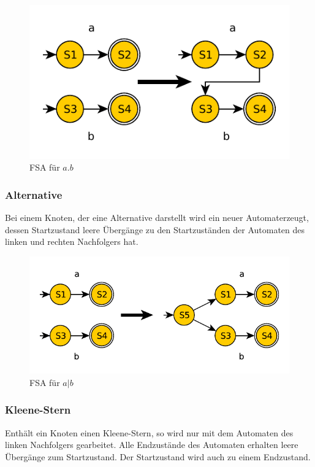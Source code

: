 \begin{figure}[H]
  \begin{center}
  \includegraphics{objectsToInclude/re_fsa_aANDb.pdf}
  \caption{FSA für $a.b$}
  \label{fig:Konkatenation}
  \end{center}
\end{figure}

\subsubsection{Alternative}
Bei einem Knoten, der eine
Alternative darstellt wird ein neuer
Automaterzeugt, dessen
Startzustand leere Übergänge zu den
Startzuständen der Automaten des
linken und rechten Nachfolgers hat.

\begin{figure}[H]
  \begin{center}
  \includegraphics{objectsToInclude/re_fsa_aOrb.pdf}
  \caption{FSA für $a|b$}
  \label{fig:Alternative1}
  \end{center}
\end{figure}

\subsubsection{Kleene-Stern}
Enthält ein Knoten einen Kleene-Stern, so wird nur mit dem Automaten des linken
Nachfolgers gearbeitet. Alle Endzustände des Automaten erhalten leere Übergänge
zum Startzustand. Der Startzustand wird auch zu einem Endzustand.

